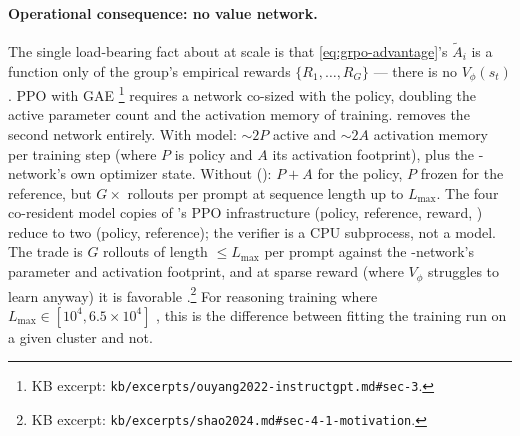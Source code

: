 \paragraph{Operational consequence: no value network.} The single
load-bearing fact about  at  scale is that
\cref{eq:grpo-advantage}'s $\tilde{A}_i$ is a function only of the
group's empirical rewards $\{R_1, \ldots, R_G\}$ --- there is no
$V_\phi(s_t)$. PPO with GAE \citep[\S
3.5]{ouyang2022-instructgpt}\footnote{KB excerpt:
\texttt{kb/excerpts/ouyang2022-instructgpt.md\#sec-3}.} requires a 
network co-sized with the policy, doubling the active parameter count
and the activation memory of training.  removes the second network
entirely. With  model: $\sim\!2P$ active  and $\sim\!2A$
activation memory per training step (where $P$ is policy  and
$A$ its activation footprint), plus the -network's own optimizer
state. Without (): $P + A$ for the policy, $P$ frozen for the
reference, but $G \times$ rollouts per prompt at sequence length up to
$L_\mathrm{max}$. The four co-resident model copies of 's PPO
infrastructure (policy, reference, reward, ) reduce to two
(policy, reference); the verifier is a CPU subprocess, not a model.
The trade is $G$ rollouts of length $\le L_\mathrm{max}$ per prompt
against the -network's parameter and activation footprint, and at
sparse reward (where $V_\phi$ struggles to learn anyway) it is
favorable \citep[\S 4.1]{shao2024}.\footnote{KB excerpt:
\texttt{kb/excerpts/shao2024.md\#sec-4-1-motivation}.} For
reasoning training where $L_\mathrm{max} \in [10^4, 6.5 \times 10^4]$
\citep[\S 2.1]{deepseek-r1}, this is the difference between fitting the
training run on a given cluster and not.

